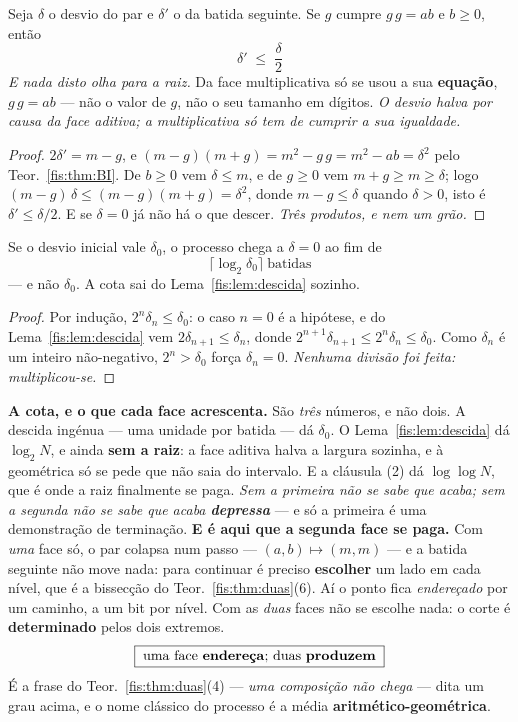 \documentclass[livro.tex]{subfiles}
\begin{document}
\begin{lema}\label{fis:lem:descida}
Seja $\delta$ o desvio do par e $\delta'$ o da batida seguinte. Se $g$ cumpre
$g\,g=ab$ e $b\ge0$, então
\[
\boxed{\;\delta'\;\le\;\frac{\delta}{2}\;}
\]
\emph{E nada disto olha para a raiz.} Da face multiplicativa só se usou a sua
\textbf{equação}, $g\,g=ab$ --- não o valor de $g$, não o seu tamanho em dígitos.
\emph{O desvio halva por causa da face aditiva; a multiplicativa só tem de
cumprir a sua igualdade.}
\end{lema}

\begin{proof}
$2\delta'=m-g$, e $(m-g)(m+g)=m^{2}-g\,g=m^{2}-ab=\delta^{2}$ pelo
Teor.~\ref{fis:thm:BI}. De $b\ge0$ vem $\delta\le m$, e de $g\ge0$ vem
$m+g\ge m\ge\delta$; logo $(m-g)\,\delta\le(m-g)(m+g)=\delta^{2}$, donde
$m-g\le\delta$ quando $\delta>0$, isto é $\delta'\le\delta/2$. E se $\delta=0$ já
não há o que descer. \emph{Três produtos, e nem um grão.}
\end{proof}
\begin{corolario}\label{fis:cor:cota}
Se o desvio inicial vale $\delta_0$, o processo chega a $\delta=0$ ao fim de
\[
\boxed{\;\bigl\lceil\log_{2}\delta_0\bigr\rceil\ \text{batidas}\;}
\]
--- e não $\delta_0$. A cota sai do Lema~\ref{fis:lem:descida} sozinho.
\end{corolario}
\begin{proof}
Por indução, $2^{n}\delta_n\le\delta_0$: o caso $n=0$ é a hipótese, e do
Lema~\ref{fis:lem:descida} vem $2\delta_{n+1}\le\delta_n$, donde
$2^{n+1}\delta_{n+1}\le2^{n}\delta_n\le\delta_0$. Como $\delta_n$ é um inteiro
não-negativo, $2^{n}>\delta_0$ força $\delta_n=0$. \emph{Nenhuma divisão foi
feita: multiplicou-se.}
\end{proof}

\medskip\noindent\textbf{A cota, e o que cada face acrescenta.} São \emph{três}
números, e não dois. A descida ingénua --- uma unidade por batida --- dá
$\delta_0$. O Lema~\ref{fis:lem:descida} dá $\log_{2}N$, e ainda \textbf{sem a raiz}: a face
aditiva halva a largura sozinha, e à geométrica só se pede que não saia do
intervalo. E a cláusula (2) dá $\log\log N$, que é onde a raiz finalmente se
paga. \emph{Sem a primeira não se sabe que acaba; sem a segunda não se sabe que
acaba \textbf{depressa}} --- e só a primeira é uma demonstração de terminação.
\medskip\noindent\textbf{E é aqui que a segunda face se paga.} Com \emph{uma}
face só, o par colapsa num passo --- $(a,b)\mapsto(m,m)$ --- e a batida seguinte
não move nada: para continuar é preciso \textbf{escolher} um lado em cada nível,
que é a bissecção do Teor.~\ref{fis:thm:duas}(6). Aí o ponto fica
\emph{endereçado} por um caminho, a um bit por nível. Com as \emph{duas} faces
não se escolhe nada: o corte é \textbf{determinado} pelos dois extremos.
\[
\boxed{\;\text{uma face \textbf{endereça}; duas \textbf{produzem}}\;}
\]
É a frase do Teor.~\ref{fis:thm:duas}(4) --- \emph{uma composição não chega} ---
dita um grau acima, e o nome clássico do processo é a média
\textbf{aritmético-geométrica}.
\end{document}
